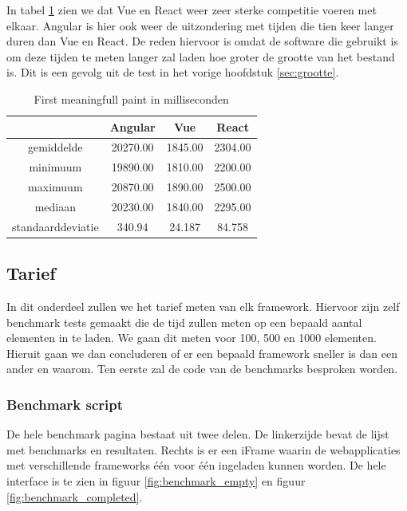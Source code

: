 In tabel \ref{table:first_meaningfull_paint} zien we dat Vue en React weer zeer sterke competitie voeren met elkaar. Angular is hier ook weer de uitzondering met tijden die tien keer langer duren dan Vue en React. De reden hiervoor is omdat de software die gebruikt is om deze tijden te meten langer zal laden hoe groter de grootte van het bestand is. Dit is een gevolg uit de test in het vorige hoofdstuk \ref{sec:grootte}.

\begin{table}[h]
	\centering
	\caption{First meaningfull paint in milliseconden}
	\label{table:first_meaningfull_paint}
	\begin{tabular}{|c|c|c|c|} \hline
									&Angular       &Vue        &React      \\ \hline
		gemiddelde			&20270.00     &1845.00  &2304.00 \\ \hline
		minimuum			&19890.00     &1810.00  &2200.00  \\ \hline
		maximuum			&20870.00    &1890.00  &2500.00 \\ \hline
		mediaan				   &20230.00    &1840.00  &2295.00 \\ \hline
		standaarddeviatie &340.94        &24.187    &84.758    \\ \hline
	\end{tabular}
\end{table}

\subsection{Tarief}
\label{sec:tarief}

In dit onderdeel zullen we het tarief meten van elk framework. Hiervoor zijn zelf benchmark tests gemaakt die de tijd zullen meten op een bepaald aantal elementen in te laden. We gaan dit meten voor 100, 500 en 1000 elementen. Hieruit gaan we dan concluderen of er een bepaald framework sneller is dan een ander en waarom. Ten eerste zal de code van de benchmarks besproken worden.

\subsubsection{Benchmark script}
\label{sec:benchmark_script}

De hele benchmark pagina bestaat uit twee delen. De linkerzijde bevat de lijst met benchmarks en resultaten. Rechts is er een iFrame waarin de webapplicaties met verschillende frameworks één voor één ingeladen kunnen worden. De hele interface is te zien in figuur \ref{fig:benchmark_empty} en figuur \ref{fig:benchmark_completed}.


